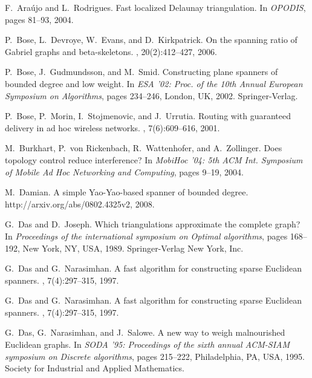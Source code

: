 \documentclass{llncs}
\begin{document}
\small
\def\cprime{$'$}
\begin{thebibliography}{10}

F.~Ara{\'u}jo and L.~Rodrigues.
\newblock Fast localized {D}elaunay triangulation.
\newblock In {\em OPODIS}, pages 81--93, 2004.

P.~Bose, L.~Devroye, W.~Evans, and D.~Kirkpatrick.
\newblock On the spanning ratio of {G}abriel graphs and beta-skeletons.
, 20(2):412--427, 2006.

P.~Bose, J.~Gudmundsson, and M.~Smid.
\newblock Constructing plane spanners of bounded degree and low weight.
\newblock In {\em {ESA} '02: Proc. of the 10th Annual European Symposium on
  Algorithms}, pages 234--246, London, UK, 2002. Springer-Verlag.

P.~Bose, P.~Morin, I.~Stojmenovic, and J.~Urrutia.
\newblock Routing with guaranteed delivery in ad hoc wireless networks.
, 7(6):609--616, 2001.

M.~Burkhart, P.~von Rickenbach, R.~Wattenhofer, and A.~Zollinger.
\newblock Does topology control reduce interference?
\newblock In {\em {Mobi{Hoc}} '04: 5th ACM Int. Symposium of Mobile Ad Hoc
  Networking and Computing}, pages 9--19, 2004.

M.~Damian.
\newblock A simple {Y}ao-{Y}ao-based spanner of bounded degree.
\newblock http://arxiv.org/abs/0802.4325v2, 2008.

G.~Das and D.~Joseph.
\newblock Which triangulations approximate the complete graph?
\newblock In {\em Proceedings of the international symposium on Optimal
  algorithms}, pages 168--192, New York, NY, USA, 1989. Springer-Verlag New
  York, Inc.

G.~Das and G.~Narasimhan.
\newblock A fast algorithm for constructing sparse {E}uclidean spanners.
, 7(4):297--315, 1997.

G.~Das and G.~Narasimhan.
\newblock A fast algorithm for constructing sparse {E}uclidean spanners.
,
  7(4):297--315, 1997.

G.~Das, G.~Narasimhan, and J.~Salowe.
\newblock A new way to weigh malnourished {E}uclidean graphs.
\newblock In {\em SODA '95: Proceedings of the sixth annual ACM-SIAM symposium
  on Discrete algorithms}, pages 215--222, Philadelphia, PA, USA, 1995. Society
  for Industrial and Applied Mathematics.


\end{thebibliography}
\end{document}
